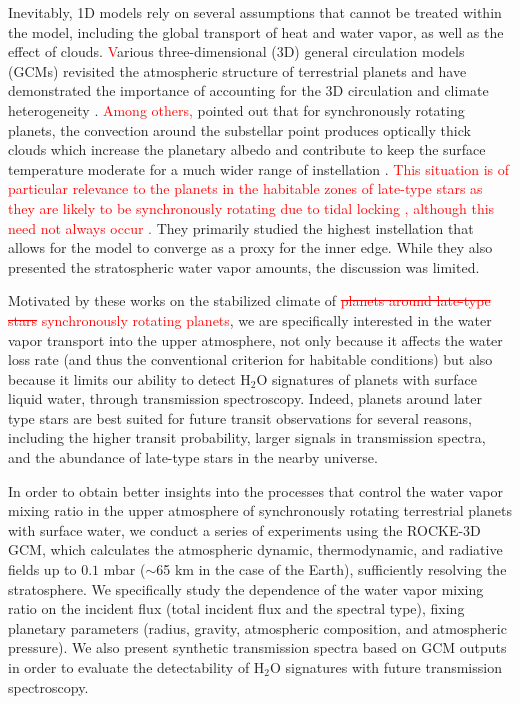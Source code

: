 \documentclass[11pt,numberedappendix,twocolappendix,]{emulateapj}
\def\water{H$_2$O}
\def\modelE{ROCKE-3D}
\def\wv{water vapor}
\def\addYF#1{\textcolor{red}{#1}}
\def\changeYF#1#2{\textcolor{red}{\sout{#1} #2}}
\begin{document}
Inevitably, 1D models rely on several assumptions that cannot be treated within the model, including the global transport of heat and water vapor, as well as the effect of clouds. 
\addYF{V}arious three-dimensional (3D) general circulation models (GCMs) revisited the atmospheric structure of terrestrial planets and have demonstrated the importance of accounting for the 3D circulation and climate heterogeneity \citep[e.g.][]{Ishiwatari2002,Abe2011,Leconte2013a,Leconte2013b,Wolf2014,Wolf2015}. 
%
%
\addYF{Among others,} \citet{Yang2013} pointed out that for synchronously rotating planets, the convection around the substellar point produces optically thick clouds which increase the planetary albedo and contribute to keep the surface temperature moderate for a much wider range of instellation \citep[see also][]{Yang2014,Way2015,Kopparapu2016}. 
\addYF{This situation is of particular relevance to the planets in the habitable zones of late-type stars as they are likely to be synchronously rotating due to tidal locking \citep{Dole1964, Kasting1993}, although this need not always occur \citep{Goldreich1966,Leconte2015}. }
They primarily studied the highest instellation that allows for the model to converge as a proxy for the inner edge. 
While they also presented the stratospheric water vapor amounts, the discussion was limited. 

Motivated by these works on the stabilized climate of \changeYF{planets around late-type stars}{synchronously rotating planets}, we are specifically interested in the \wv{} transport into the upper atmosphere, not only because it affects the water loss rate (and thus the conventional criterion for habitable conditions) but also because it limits our ability to detect \water{} signatures of planets with surface liquid water, through transmission spectroscopy. 
%
Indeed, planets around later type stars are best suited for future transit observations for several reasons, including the higher transit probability, larger signals in transmission spectra, and the abundance of late-type stars in the nearby universe. 

In order to obtain better insights into the processes that control the \wv{}  mixing ratio in the upper atmosphere of synchronously rotating terrestrial planets with surface water, we conduct a series of experiments using the \modelE{} GCM, which calculates the atmospheric dynamic, thermodynamic, and radiative fields up to $0.1$ mbar ($\sim $65 km in the case of the Earth), sufficiently resolving the stratosphere. 
We specifically study the dependence of the \wv{} mixing ratio on the incident flux (total incident flux and the spectral type), fixing planetary parameters (radius, gravity, atmospheric composition, and atmospheric pressure). 
We also present synthetic transmission spectra based on GCM outputs in order to evaluate the detectability of \water{} signatures with future transmission spectroscopy. 
\end{document}
